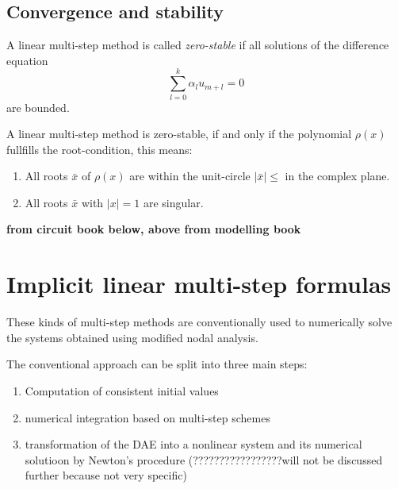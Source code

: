 	\subsection{Convergence and stability}
	
	\begin{definition}
		A linear multi-step method is called \emph{zero-stable} if all solutions of the difference equation
		\begin{displaymath}
			\sum_{l=0}^{k} \alpha_l u_{m+l} = 0
		\end{displaymath}
		are bounded.
	\end{definition}
	
	\begin{theorem}
		A linear multi-step method is zero-stable, if and only if the polynomial $\rho(x)$ fullfills the root-condition, this means:
		\begin{enumerate}
			\item All roots $\bar{x}$ of $\rho(x)$ are within the unit-circle $|\bar{x}| \leq$ in the complex plane.
			\item All roots $\bar{x}$ with $|x| = 1$ are singular.
		\end{enumerate}
	\end{theorem}
	
	
	\textbf{from circuit book below, above from modelling book}

\section{Implicit linear multi-step formulas}
These kinds of multi-step methods are conventionally used to numerically solve the systems obtained using modified nodal analysis. 

The conventional approach can be split into three main steps:
\begin{enumerate}
	\item Computation of consistent initial values
	\item numerical integration based on multi-step schemes
	\item transformation of the DAE into a nonlinear system and its numerical solutioon by Newton's procedure (?????????????????will not be discussed further because not very specific)
\end{enumerate}

